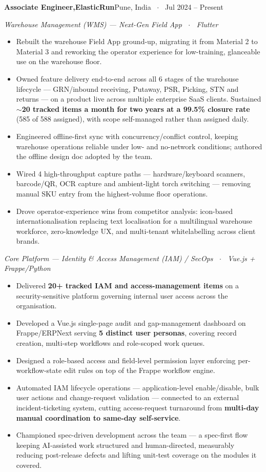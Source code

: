 \documentclass[a4paper,10pt]{article}
\newcommand{\role}[3]{%
  \vspace{5pt}%
  {\normalsize\bfseries #1}\;\textcolor{accent2}{\bfseries #2}\hfill{\small\color{muted}#3}%
  \par\vspace{1pt}}
\newcommand{\workstream}[1]{{\small\itshape\color{muted}#1}\par\vspace{-1pt}}
\begin{document}
\role{Associate Engineer,}{ElasticRun}{Pune, India \, $\cdot$ \, Jul 2024 -- Present}
\workstream{Warehouse Management (WMS) --- Next-Gen Field App \, $\cdot$ \, Flutter}
\begin{itemize}
  \item Rebuilt the warehouse Field App ground-up, migrating it from Material 2 to Material 3 and reworking the operator experience for low-training, glanceable use on the warehouse floor.
  \item Owned feature delivery end-to-end across all 6 stages of the warehouse lifecycle --- GRN/inbound receiving, Putaway, PSR, Picking, STN and returns --- on a product live across multiple enterprise SaaS clients. Sustained \textbf{$\sim$20 tracked items a month for two years at a 99.5\% closure rate} (585 of 588 assigned), with scope self-managed rather than assigned daily.
  \item Engineered offline-first sync with concurrency/conflict control, keeping warehouse operations reliable under low- and no-network conditions; authored the offline design doc adopted by the team.
  \item Wired 4 high-throughput capture paths --- hardware/keyboard scanners, barcode/QR, OCR capture and ambient-light torch switching --- removing manual SKU entry from the highest-volume floor operations.
  \item Drove operator-experience wins from competitor analysis: icon-based internationalisation replacing text localisation for a multilingual warehouse workforce, zero-knowledge UX, and multi-tenant whitelabelling across client brands.
\end{itemize}

\workstream{Core Platform --- Identity \& Access Management (IAM) / SecOps \, $\cdot$ \, Vue.js + Frappe/Python}
\begin{itemize}
  \item Delivered \textbf{20+ tracked IAM and access-management items} on a security-sensitive platform governing internal user access across the organisation.
  \item Developed a Vue.js single-page audit and gap-management dashboard on Frappe/ERPNext serving \textbf{5 distinct user personas}, covering record creation, multi-step workflows and role-scoped work queues.
  \item Designed a role-based access and field-level permission layer enforcing per-workflow-state edit rules on top of the Frappe workflow engine.
  \item Automated IAM lifecycle operations --- application-level enable/disable, bulk user actions and change-request validation --- connected to an external incident-ticketing system, cutting access-request turnaround from \textbf{multi-day manual coordination to same-day self-service}.
  \item Championed spec-driven development across the team --- a spec-first flow keeping AI-assisted work structured and human-directed, measurably reducing post-release defects and lifting unit-test coverage on the modules it covered.
\end{itemize}
\end{document}

